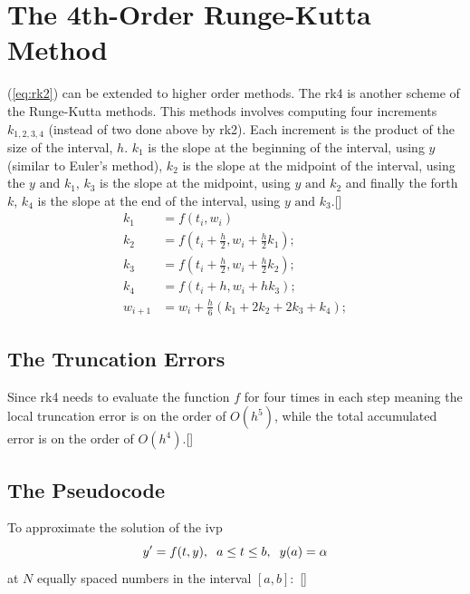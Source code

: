 \documentclass[12pt,oneside]{book}
\begin{document}
	\section{The 4th-Order Runge-Kutta Method} \label{m:rk4}
		\begin{spacing}{1.2}
			
			(\ref{eq:rk2}) can be extended to higher order methods. The \ac{rk4} is another scheme of the Runge-Kutta methods. This methods involves computing four increments $ k_{1,2,3,4} $ (instead of two done above by \ac{rk2}). Each increment is the product of the size of the interval, $ h $. $ k_{1} $ is the slope at the beginning of the interval, using $ y $ (similar to Euler's method), $ k_{2} $ is the slope at the midpoint of the interval, using the $ y \text{ and } k_{1}$, $ k_{3} $ is the slope at the midpoint, using $ y \text{ and } k_{2} $ and finally the forth $ k $, $ k_{4} $ is the slope at the end of the interval, using $ y \text{ and } k_{3} $.[]
			\begin{equation} \label{eq:rk4}
				\begin{split}
					k_{1} & = f(t_{i},w_{i}) \\
					k_{2} & = f\left(t_{i} + \frac{h}{2}, w_{i} + \frac{h}{2}k_{1}\right); \\
					k_{3} & = f\left(t_{i} + \frac{h}{2}, w_{i} + \frac{h}{2}k_{2}\right); \\
					k_{4} & = f\left(t_{i} + h, w_{i} + hk_{3}\right); \\
					w_{i+1} & = w_{i} + \frac{h}{6} ( k_{1} + 2k_{2} + 2k_{3} + k_{4} );
				\end{split}
			\end{equation}
			
			\subsection*{The Truncation Errors}
				Since \ac{rk4} needs to evaluate the function $ f $ for four times in each step meaning the local truncation error is on the order of $ O(h^{5}) $, while the total accumulated error is on the order of $ O(h^{4}) $.[]
			
			\clearpage
			\subsection*{The Pseudocode}
				To approximate the solution of the \ac{ivp} 
				\[ y' = f(t,y), \hspace*{0.2cm} a \leq t \leq b, \hspace*{0.2cm} y(a) = \alpha \]
				at $ N $ equally spaced numbers in the interval $ [a, b]: $ []
				

\end{spacing}
\end{document}

